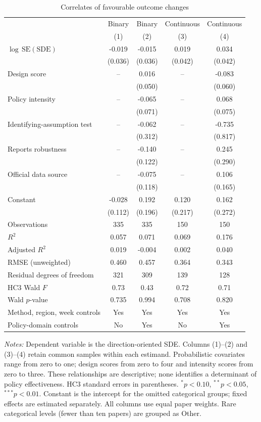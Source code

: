 \begin{table}[htbp]\centering\small
\caption{Correlates of favourable outcome changes}\label{tab:policy_regressions}
\setlength{\tabcolsep}{4pt}
\begin{tabular}{lcccc}\toprule
 & Binary & Binary & Continuous & Continuous \\
 & (1) & (2) & (3) & (4) \\
\midrule
$\log\,\mathrm{SE}(\mathrm{SDE})$ & -0.019 & -0.015 & 0.019 & 0.034 \\
 & (0.036) & (0.036) & (0.042) & (0.042) \\
Design score & -- & 0.016 & -- & -0.083 \\
 &  & (0.050) &  & (0.060) \\
Policy intensity & -- & -0.065 & -- & 0.068 \\
 &  & (0.071) &  & (0.075) \\
Identifying-assumption test & -- & -0.062 & -- & -0.735 \\
 &  & (0.312) &  & (0.817) \\
Reports robustness & -- & -0.140 & -- & 0.245 \\
 &  & (0.122) &  & (0.290) \\
Official data source & -- & -0.075 & -- & 0.106 \\
 &  & (0.118) &  & (0.165) \\
Constant & -0.028 & 0.192 & 0.120 & 0.162 \\
 & (0.112) & (0.196) & (0.217) & (0.272) \\
\midrule Observations & 335 & 335 & 150 & 150 \\
$R^2$ & 0.057 & 0.071 & 0.069 & 0.176 \\
Adjusted $R^2$ & 0.019 & -0.004 & 0.002 & 0.040 \\
RMSE (unweighted) & 0.460 & 0.457 & 0.364 & 0.343 \\
Residual degrees of freedom & 321 & 309 & 139 & 128 \\
HC3 Wald $F$ & 0.73 & 0.43 & 0.72 & 0.71 \\
Wald $p$-value & 0.735 & 0.994 & 0.708 & 0.820 \\
Method, region, week controls & Yes & Yes & Yes & Yes \\
Policy-domain controls & No & Yes & No & Yes \\
\bottomrule\end{tabular}
\par\vspace{4pt}\begin{minipage}{\textwidth}\footnotesize
\textit{Notes:} Dependent variable is the direction-oriented SDE. Columns (1)--(2) and (3)--(4) retain common samples within each estimand. Probabilistic covariates range from zero to one; design scores from zero to four and intensity scores from zero to three. These relationships are descriptive; none identifies a determinant of policy effectiveness. HC3 standard errors in parentheses. $^{*}p<0.10$, $^{**}p<0.05$, $^{***}p<0.01$. Constant is the intercept for the omitted categorical groups; fixed effects are estimated separately. All columns use equal paper weights. Rare categorical levels (fewer than ten papers) are grouped as Other.
\end{minipage}
\end{table}
